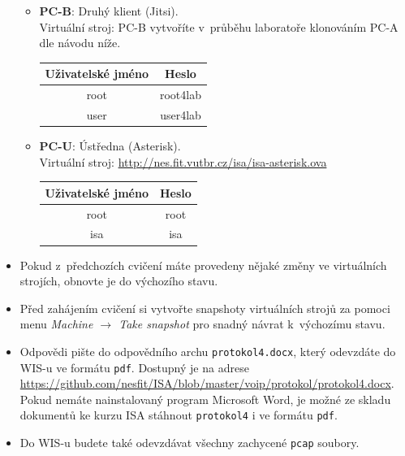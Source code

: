 \begin{itemize}
\begin{itemize}
	\item \textbf{PC-B}: Druhý klient (Jitsi).\\
	Virtuální stroj: PC-B vytvoříte v~průběhu laboratoře klonováním PC-A dle návodu níže.
	\begin{table}[H]
		\centering
		\begin{tabular}{|c|c|}
		\hline
		\textbf{Uživatelské jméno} & \textbf{Heslo} \\ \hline
		root                       & root4lab       \\ \hline
		user                       & user4lab       \\ \hline
		\end{tabular}
	\end{table}
	\item \textbf{PC-U}: Ústředna (Asterisk).\\
	Virtuální stroj: \url{http://nes.fit.vutbr.cz/isa/isa-asterisk.ova}
	\begin{table}[H]
		\centering
		\begin{tabular}{|c|c|}
		\hline
		\textbf{Uživatelské jméno} & \textbf{Heslo} \\ \hline
		root                       & root       \\ \hline
		isa                       & isa       \\ \hline
		\end{tabular}
	\end{table}
  \end{itemize}
  \item Pokud z~předchozích cvičení máte provedeny nějaké změny ve virtuálních strojích, obnovte je do výchozího stavu.
  \item Před zahájením cvičení si vytvořte snapshoty virtuálních strojů za pomoci
  menu \textit{Machine $\rightarrow$ Take snapshot} pro snadný návrat k~výchozímu stavu.
  \item Odpovědi pište do odpovědního archu \texttt{protokol4.docx}, který odevzdáte do WIS-u ve formátu \texttt{pdf}.
  Dostupný je na adrese\\
  \url{https://github.com/nesfit/ISA/blob/master/voip/protokol/protokol4.docx}.\\
  Pokud nemáte nainstalovaný program Microsoft Word, je možné ze skladu dokumentů ke kurzu ISA stáhnout \texttt{protokol4} i ve formátu \texttt{pdf}.
  \item Do WIS-u budete také odevzdávat všechny zachycené \texttt{pcap} soubory.
\end{itemize}


